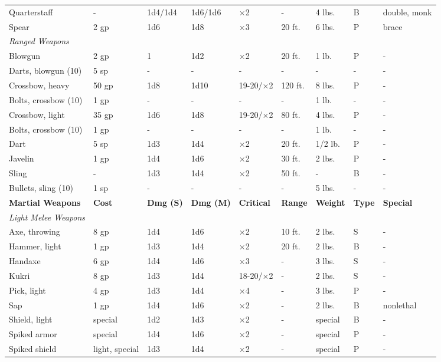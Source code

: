 \begin{table*}[]
\begin{tabular}{lllllllll}
 Quarterstaff & - & 1d4/1d4 & 1d6/1d6 & $\times$2 & - & 4 lbs. & B & double, monk \\
 Spear & 2 gp & 1d6 & 1d8 & $\times$3 & 20 ft. & 6 lbs. & P & brace \\
 \textit{Ranged Weapons} \\
 Blowgun & 2 gp & 1 & 1d2 & $\times$2 & 20 ft. & 1 lb. & P & - \\
 Darts, blowgun (10) & 5 sp & - & - & - & - & - & - & - \\
 Crossbow, heavy & 50 gp & 1d8 & 1d10 & 19-20/$\times$2 & 120 ft. & 8 lbs. & P & - \\
 Bolts, crossbow (10) & 1 gp & - & - & - & - & 1 lb. & - & - \\
 Crossbow, light & 35 gp & 1d6 & 1d8 & 19-20/$\times$2 & 80 ft. & 4 lbs. & P & - \\
 Bolts, crossbow (10) & 1 gp & - & - & - & - & 1 lb. & - & - \\
 Dart & 5 sp & 1d3 & 1d4 & $\times$2 & 20 ft. & 1/2 lb. & P & - \\
 Javelin & 1 gp & 1d4 & 1d6 & $\times$2 & 30 ft. & 2 lbs. & P & - \\
 Sling & - & 1d3 & 1d4 & $\times$2 & 50 ft. & - & B & - \\
 Bullets, sling (10) & 1 sp & - & - & - & - & 5 lbs. & - & -\\
\textbf{Martial Weapons} & \textbf{Cost} & \textbf{Dmg (S)} & \textbf{Dmg (M)} & \textbf{Critical} & \textbf{Range} & \textbf{Weight} & \textbf{Type} & \textbf{Special}\\
\textit{Light Melee Weapons} \\
 Axe, throwing & 8 gp & 1d4 & 1d6 & $\times$2 & 10 ft. & 2 lbs. & S & - \\
 Hammer, light & 1 gp & 1d3 & 1d4 & $\times$2 & 20 ft. & 2 lbs. & B & - \\
 Handaxe & 6 gp & 1d4 & 1d6 & $\times$3 & - & 3 lbs. & S & - \\
 Kukri & 8 gp & 1d3 & 1d4 & 18-20/$\times$2 & - & 2 lbs. & S & - \\
 Pick, light & 4 gp & 1d3 & 1d4 & $\times$4 & - & 3 lbs. & P & - \\
 Sap & 1 gp & 1d4 & 1d6 & $\times$2 & - & 2 lbs. & B & nonlethal \\
 Shield, light & special & 1d2 & 1d3 & $\times$2 & - & special & B & - \\
 Spiked armor & special & 1d4 & 1d6 & $\times$2 & - & special & P & - \\
 Spiked shield & light, special & 1d3 & 1d4 & $\times$2 & - & special & P & - \\

\end{tabular}
\end{table*}
